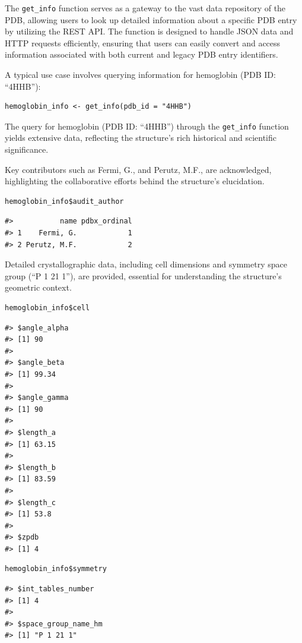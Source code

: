 The \texttt{get\_info} function serves as a gateway to the vast data repository of the PDB, allowing users to look up detailed information about a specific PDB entry by utilizing the REST API. The function is designed to handle JSON data and HTTP requests efficiently, ensuring that users can easily convert and access information associated with both current and legacy PDB entry identifiers.

A typical use case involves querying information for hemoglobin (PDB ID: ``4HHB''):

\begin{verbatim}
hemoglobin_info <- get_info(pdb_id = "4HHB")
\end{verbatim}

The query for hemoglobin (PDB ID: ``4HHB'') through the \texttt{get\_info} function yields extensive data, reflecting the structure's rich historical and scientific significance.

Key contributors such as Fermi, G., and Perutz, M.F., are acknowledged, highlighting the collaborative efforts behind the structure's elucidation.

\begin{verbatim}
hemoglobin_info$audit_author
\end{verbatim}

\begin{verbatim}
#>           name pdbx_ordinal
#> 1    Fermi, G.            1
#> 2 Perutz, M.F.            2
\end{verbatim}

Detailed crystallographic data, including cell dimensions and symmetry space group (``P 1 21 1''), are provided, essential for understanding the structure's geometric context.

\begin{verbatim}
hemoglobin_info$cell
\end{verbatim}

\begin{verbatim}
#> $angle_alpha
#> [1] 90
#> 
#> $angle_beta
#> [1] 99.34
#> 
#> $angle_gamma
#> [1] 90
#> 
#> $length_a
#> [1] 63.15
#> 
#> $length_b
#> [1] 83.59
#> 
#> $length_c
#> [1] 53.8
#> 
#> $zpdb
#> [1] 4
\end{verbatim}

\begin{verbatim}
hemoglobin_info$symmetry
\end{verbatim}

\begin{verbatim}
#> $int_tables_number
#> [1] 4
#> 
#> $space_group_name_hm
#> [1] "P 1 21 1"
\end{verbatim}

